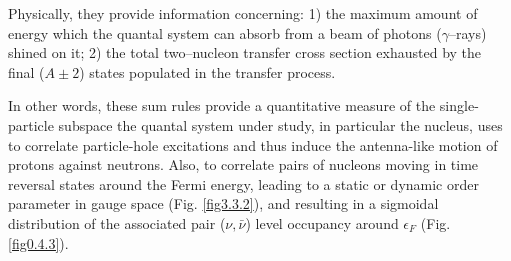 %








 Physically, they provide  information concerning: 1) the maximum amount of energy which the quantal system can absorb from a beam of photons ($\gamma$--rays) shined on it; 2) the total two--nucleon transfer cross section  exhausted by the final ($A\pm2$) states populated in the transfer process.







In other words, these sum rules provide a quantitative measure of the single-particle subspace the quantal system under study, in particular the nucleus, uses to correlate particle-hole excitations and thus induce the antenna-like motion of protons against neutrons. Also, to correlate pairs of nucleons moving in time reversal states around the Fermi energy, leading to a static or dynamic order parameter in gauge space (Fig. \ref{fig3.3.2}), and resulting in a sigmoidal distribution of the associated pair ($\nu,\bar{\nu}$) level occupancy around $\epsilon_F$  (Fig. \ref{fig0.4.3}). 


